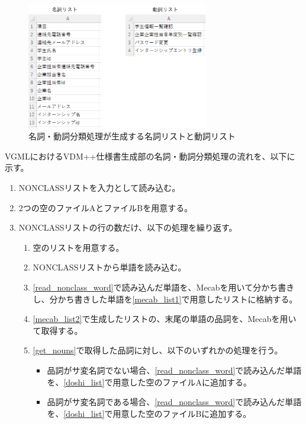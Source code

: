 \begin{figure}[t]
    \begin{center}
        \includegraphics[width=300]{image/meishi_doshi_list.png}
        \caption{名詞・動詞分類処理が生成する名詞リストと動詞リスト}
        \label{fig:meishi_doshi_list}
    \end{center}
\end{figure}

VGMLにおけるVDM++仕様書生成部の名詞・動詞分類処理の流れを、以下に示す。

\begin{enumerate}
    \item NONCLASSリストを入力として読み込む。
    \item 2つの空のファイルAとファイルBを用意する。
    \label{doshi_list}
    \item NONCLASSリストの行の数だけ、以下の処理を繰り返す。
        \begin{enumerate}
            \item 空のリストを用意する。
            \label{mecab_list1}
            \item NONCLASSリストから単語を読み込む。
            \label{read_nonclass_word}
            \item \ref{read_nonclass_word}で読み込んだ単語を、Mecabを用いて分かち書きし、分かち書きした単語を\ref{mecab_list1}で用意したリストに格納する。
            \label{mecab_list2}
            \item \ref{mecab_list2}で生成したリストの、末尾の単語の品詞を、Mecabを用いて取得する。
            \label{get_nouns}
            \item \ref{get_nouns}で取得した品詞に対し、以下のいずれかの処理を行う。
                \begin{itemize}
                    \item 品詞がサ変名詞でない場合、\ref{read_nonclass_word}で読み込んだ単語を、\ref{doshi_list}で用意した空のファイルAに追加する。
                    \item 品詞がサ変名詞である場合、\ref{read_nonclass_word}で読み込んだ単語を、\ref{doshi_list}で用意した空のファイルBに追加する。
                \end{itemize}
        \end{enumerate}
\end{enumerate}

